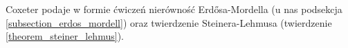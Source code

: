 Coxeter podaje w formie ćwiczeń nierówność Erdősa-Mordella (u nas podsekcja \ref{subsection_erdos_mordell}) oraz twierdzenie Steinera-Lehmusa (twierdzenie \ref{theorem_steiner_lehmus}). 
%
%


%